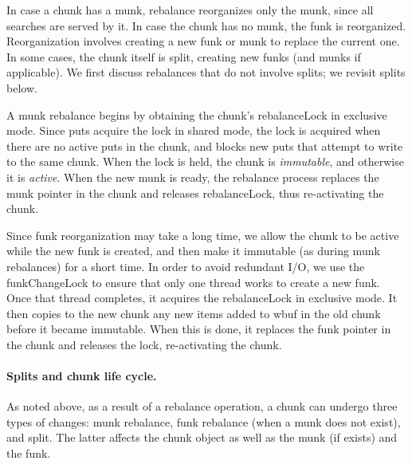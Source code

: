 In case a chunk has a munk, rebalance reorganizes only  the munk, since all searches are served by it. In case the chunk has no munk, the funk is reorganized. Reorganization involves creating a new funk or munk 
to replace the  current one.  In some cases, the chunk itself is split, creating new funks (and munks if applicable). We first discuss 
rebalances that do not involve splits; we revisit splits below.

A munk rebalance begins by obtaining the chunk's rebalanceLock in exclusive mode. Since puts acquire the lock in shared mode,
the lock is acquired when there are no active puts in the chunk, and blocks new puts that attempt to write to the same chunk. 
When the lock is held, the chunk is \emph{immutable}, and otherwise it is \emph{active}. 
When the new munk is ready, the rebalance process replaces the munk pointer in the chunk and releases rebalanceLock, thus 
re-activating the chunk.

Since funk reorganization may take a long time, we allow the chunk to be active while the new funk is created,
and then make it immutable (as during munk rebalances) for a short time. In order to avoid redundant I/O, 
we use the funkChangeLock to ensure that only one thread works to create a new funk.  Once that thread
completes, it acquires the rebalanceLock in exclusive mode.
It then copies to the new chunk any new items added to wbuf in the old chunk before it became immutable. 
When this is done, it replaces the funk pointer in the chunk and releases the lock, re-activating the chunk.

\paragraph{Splits and chunk life cycle.}

As noted above, as a result of a rebalance operation, a chunk can undergo three types of changes: munk rebalance, funk rebalance
(when a munk does not exist), and split. The latter affects the chunk object as well as the munk (if exists) and the funk.

